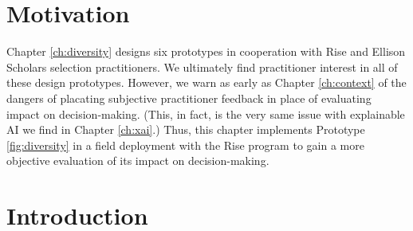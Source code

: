 


\section{Motivation}
Chapter \ref{ch:diversity} designs six prototypes in cooperation with Rise and Ellison Scholars selection practitioners. We ultimately find practitioner interest in all of these design prototypes. However, we warn as early as Chapter \ref{ch:context} of the dangers of placating subjective practitioner feedback in place of evaluating impact on decision-making. (This, in fact, is the very same issue with explainable AI we find in Chapter \ref{ch:xai}.) Thus, this chapter implements Prototype \ref{fig:diversity} in a field deployment with the Rise program to gain a more objective evaluation of its impact on decision-making.

\section{Introduction}\label{sec:spfintro}



